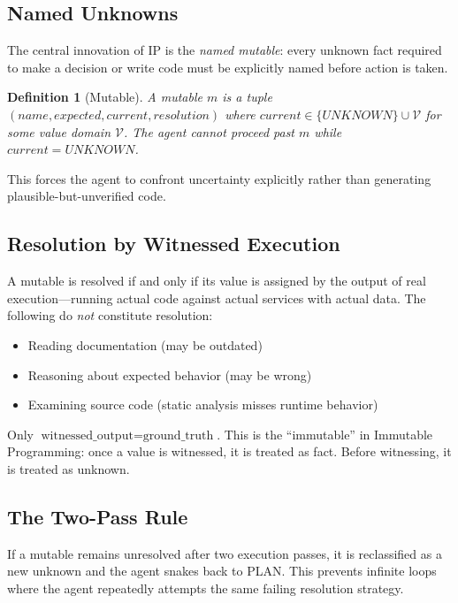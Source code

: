\documentclass[11pt,twocolumn]{article}
\newtheorem{definition}{Definition}
\begin{document}
\subsection{Named Unknowns}

The central innovation of IP is the \emph{named mutable}: every unknown fact required to make a decision or write code must be explicitly named before action is taken.

\begin{definition}[Mutable]
A mutable $m$ is a tuple $(name, expected, current, resolution)$ where $current \in \{UNKNOWN\} \cup \mathcal{V}$ for some value domain $\mathcal{V}$. The agent cannot proceed past $m$ while $current = UNKNOWN$.
\end{definition}

This forces the agent to confront uncertainty explicitly rather than generating plausible-but-unverified code.

\subsection{Resolution by Witnessed Execution}

A mutable is resolved if and only if its value is assigned by the output of real execution---running actual code against actual services with actual data. The following do \emph{not} constitute resolution:

\begin{itemize}[nosep]
    \item Reading documentation (may be outdated)
    \item Reasoning about expected behavior (may be wrong)
    \item Examining source code (static analysis misses runtime behavior)
\end{itemize}

Only $\text{witnessed\_output} = \text{ground\_truth}$. This is the ``immutable'' in Immutable Programming: once a value is witnessed, it is treated as fact. Before witnessing, it is treated as unknown.

\subsection{The Two-Pass Rule}

If a mutable remains unresolved after two execution passes, it is reclassified as a new unknown and the agent snakes back to PLAN. This prevents infinite loops where the agent repeatedly attempts the same failing resolution strategy.
\end{document}
